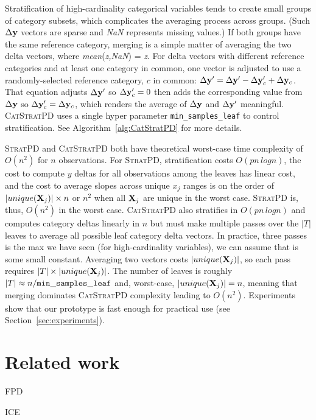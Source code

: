 \documentclass{article}
\newcommand{\secref}[1]{Section~\ref{#1}}
\newcommand{\algref}[1]{Algorithm~\ref{#1}}
\newcommand{\spd}{\fontfamily{cmr}\textsc{\small StratPD}}
\newcommand{\cspd}{\fontfamily{cmr}\textsc{\small CatStratPD}}
\begin{document}
Stratification of high-cardinality categorical variables tends to create small groups of category subsets, which complicates the averaging process across groups. (Such $\Delta {\bf y}$ vectors are sparse and {\it NaN} represents missing values.) If both groups have the same reference category, merging is a simple matter of averaging the two delta vectors, where {\it mean}({\it z,NaN}) = {\it z}.  For delta vectors with different reference categories and at least one category in common, one vector is adjusted to use a randomly-selected reference category, $c$ in common: $\Delta {\bf y}' = \Delta {\bf y}' - \Delta {\bf y}_c' + \Delta {\bf y}_c$. That equation adjusts $\Delta {\bf y}'$ so $\Delta {\bf y}_c'=0$ then adds the corresponding value from $\Delta {\bf y}$ so $\Delta {\bf y}_c' = \Delta {\bf y}_c$, which renders the average of $\Delta {\bf y}$ and $\Delta {\bf y}'$ meaningful.  \cspd{} uses a single hyper parameter {\tt\small min\_samples\_leaf} to control stratification. See \algref{alg:CatStratPD} for more details.

\spd{} and \cspd{} both have theoretical worst-case time complexity of $O(n^2)$ for $n$ observations. For \spd{}, stratification costs $O(p n \,log n)$, the cost to compute $y$ deltas for all observations among the leaves has linear cost, and the cost to average slopes across unique $x_j$ ranges is on the order of $|unique({\bf X}_j)| \times n$ or $n^2$ when all ${\bf X}_j$ are unique in the worst case. \spd{} is, thus, $O(n^2)$ in the worst case.  \cspd{} also stratifies in $O(p n \,log n)$ and computes category deltas linearly in $n$ but must make multiple passes over the $|T|$ leaves to average all possible leaf category delta vectors.  In practice, three passes is the max we have seen (for high-cardinality variables), we can assume that is some small constant. Averaging two vectors costs $|unique({\bf X}_j)|$, so each pass requires $|T| \times |unique({\bf X}_j)|$. The number of leaves is roughly $|T| \approx n / {\tt\small min\_samples\_leaf}$ and, worst-case, $|unique({\bf X}_j)|=n$, meaning that merging dominates \cspd{} complexity leading to $O(n^2)$.  Experiments show that our prototype is fast enough for practical use (see \secref{sec:experiments}).

\section{Related work}\label{sec:related}

FPD

ICE
\end{document}
